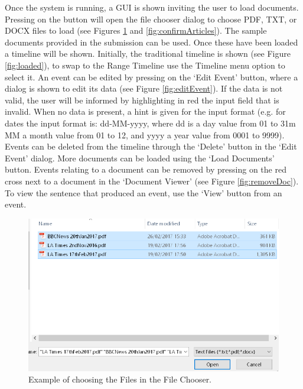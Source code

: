 \par Once the system is running, a GUI is shown inviting the user to load documents. Pressing on the button will open the file chooser dialog to choose PDF, TXT, or DOCX files to load (see Figures \ref{fig:fileDirectory} and \ref{fig:confirmArticles}). The sample documents provided in the submission can be used. Once these have been loaded a timeline will be shown. Initially, the traditional timeline is shown (see Figure \ref{fig:loaded}), to swap to the Range Timeline use the Timeline menu option to select it. An event can be edited by pressing on the `Edit Event' button, where a dialog is shown to edit its data (see Figure \ref{fig:editEvent}). If the data is not valid, the user will be informed by highlighting in red the input field that is invalid. When no data is present, a hint is given for the input format (e.g. for dates the input format is: dd-MM-yyyy, where dd is a day value from 01 to 31m MM a month value from 01 to 12, and yyyy a year value from 0001 to 9999). Events can be deleted from the timeline through the `Delete' button in the `Edit Event' dialog. More documents can be loaded using the `Load Documents' button. Events relating to a document can be removed by pressing on the red cross next to a document in the `Document Viewer' (see Figure \ref{fig:removeDoc}). To view the sentence that produced an event, use the `View' button from an event.

\begin{figure}[H]
\caption{Example of choosing the Files in the File Chooser.}
\label{fig:fileDirectory}
\includegraphics{fileDirectory.PNG}
\centering
\end{figure}

